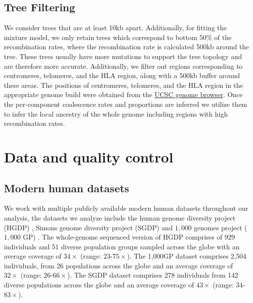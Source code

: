 \subsection{Tree Filtering}

We consider trees that are at least 10kb apart.
%
Additionally, for fitting the mixture model, we only retain trees which correspond to bottom 50\% of the recombination rates, where the recombination rate is calculated 500kb around the tree.
%
These trees usually have more mutations to support the tree topology and are therefore more accurate.
%
Additionally, we filter out regions corresponding to centromeres, telomeres, and the HLA region, along with a 500kb buffer around these areas. The positions of centromeres, telomeres, and the HLA region in the appropriate genome build were obtained from the \href{https://genome.ucsc.edu/goldenPath/help/ftp.html}{UCSC genome browser}.
%
Once the per-component coalescence rates and proportions are inferred we utilize them to infer the local ancestry of the whole genome including regions with high recombination rates.

\section{Data and quality control}
\label{sec:ch2-gb-data}
\subsection{Modern human datasets}

We work with multiple publicly available modern human datasets throughout our analysis, the datasets we analyze include the human genome diversity project (HGDP) \cite{cann2002human, bergstrom2020insights}, Simons genome diversity project (SGDP) \cite{mallick2016simons} and $1{,}000$ genomes project ($1{,}000$ GP) \cite{sudmant2015integrated, 10002015global}.
%
The whole-genome sequenced version of HGDP \cite{bergstrom2020insights} comprises of 929 individuals and 51 diverse population groups sampled across the globe with an average coverage of $34 \times$ (range: $23$-$75 \times$).
%
The 1,000GP dataset comprises 2,504 individuals, from 26 populations across the globe and an average coverage of $32 \times$ (range: $26$-$66 \times$).
%
The SGDP dataset comprises 278 individuals from 142 diverse populations across the globe and an average coverage of $43 \times$ (range: $34$-$83 \times$).

